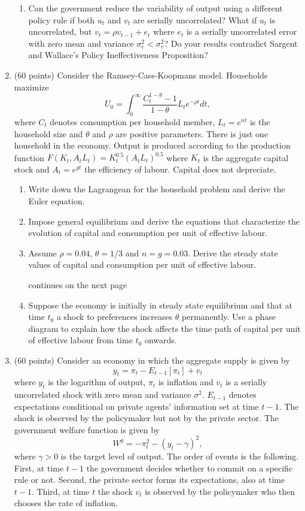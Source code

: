 \documentclass[12pt,a4paper]{article}
\begin{document}
\begin{enumerate}
\begin{enumerate}
\item Can the government reduce the variability of output
  using a different policy rule if both $u_{t}$ and $v_{t}$ are serially
  uncorrelated? What if $%
  u_{t}$ is uncorrelated, but $v_{t}=\rho v_{t-1}+e_{t}$ where $e_{t}$
  is a serially uncorrelated error with zero mean and variance $\sigma
  _{e}^{2}<\sigma _{v}^{2}$? Do your results contradict Sargent and
  Wallace's Policy Ineffectiveness Proposition?
\end{enumerate}
\item (60 points) Consider the Ramsey-Cass-Koopmans model.  Households
  maximize
  \[U_{0}=\int_{0}^{\infty}\frac{C_{t}^{1-\theta}-1}{1-\theta}L_{t}e^{-\rho
    t}dt,\] 
where $C_{t}$ denotes consumption per household member,
  $L_{t}=e^{nt}$ is the household size and $\theta$ and $\rho$ are
  positive parameters. There is just one household in the economy. Output is
  produced according to the production function
  $F(K_{t},A_{t}L_{t})=K_{t}^{0.5}(A_{t}L_{t})^{0.5}$ where $K_{t}$ is
  the aggregate capital stock and $A_{t}=e^{gt}$ the efficiency of
  labour. Capital does not depreciate.
  \begin{enumerate}
  \item Write down the Lagrangean for the household problem and derive
    the Euler equation.
  \item Impose general equilibrium and derive the equations that
    characterize the evolution of capital  and consumption per unit of
    effective labour.
  \item Assume $\rho=0.04$, $\theta=1/3$ and $n=g=0.03.$ Derive the
    steady state values of capital and consumption per unit of effective
    labour.

\vfill \hfill continues on the next page\newpage

  \item Suppose the economy is initially in steady state equilibrium
    and that at time $t_{0}$ a shock to preferences increases $\theta$
    permanently. Use a phase diagram to explain how the shock affects
    the time path of capital per unit of effective labour from time
    $t_{0}$ onwards.  
\end{enumerate}



\item (60 points) Consider an economy in which the aggregate supply is
  given by
\[
y_{t}=\pi _{t}-E_{t-1}[\pi _{t}]+v_{t} 
\]
where $y_{t}$ is the logarithm of output, $\pi _{t}$ is inflation and
$v_{t}$ is a serially uncorrelated shock with zero mean and variance
$\sigma ^{2}.$ $E_{t-1}$ denotes expectations conditional on private
agents' information set at time $t-1.$ The shock is observed by the
policymaker but not by the private sector. The government welfare
function is given by
\[
W^{g}=-\pi _{t}^{2}-(y_{t}-\gamma )^{2}, 
\]
where $\gamma>0$ is the target level of output.  The order of events
is the following.  First, at time $t-1$ the government decides whether
to commit on a specific rule or not. Second, the private sector forms
its expectations, also at time $t-1$. Third, at time $t$ the shock
$v_{t}$ is observed by the policymaker who then chooses the rate of
inflation.


\end{enumerate}
\end{document}
